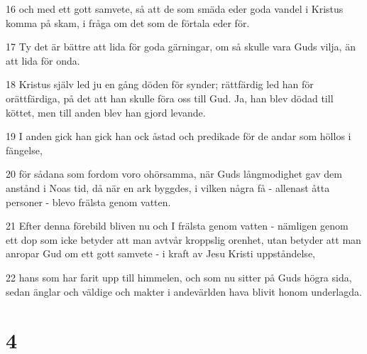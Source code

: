 \par 16 och med ett gott samvete, så att de som smäda eder goda vandel i Kristus komma på skam, i fråga om det som de förtala eder för.
\par 17 Ty det är bättre att lida för goda gärningar, om så skulle vara Guds vilja, än att lida för onda.
\par 18 Kristus själv led ju en gång döden för synder; rättfärdig led han för orättfärdiga, på det att han skulle föra oss till Gud. Ja, han blev dödad till köttet, men till anden blev han gjord levande.
\par 19 I anden gick han gick han ock åstad och predikade för de andar som höllos i fängelse,
\par 20 för sådana som fordom voro ohörsamma, när Guds långmodighet gav dem anstånd i Noas tid, då när en ark byggdes, i vilken några få - allenast åtta personer - blevo frälsta genom vatten.
\par 21 Efter denna förebild bliven nu och I frälsta genom vatten - nämligen genom ett dop som icke betyder att man avtvår kroppslig orenhet, utan betyder att man anropar Gud om ett gott samvete - i kraft av Jesu Kristi uppståndelse,
\par 22 hans som har farit upp till himmelen, och som nu sitter på Guds högra sida, sedan änglar och väldige och makter i andevärlden hava blivit honom underlagda.

\chapter{4}

